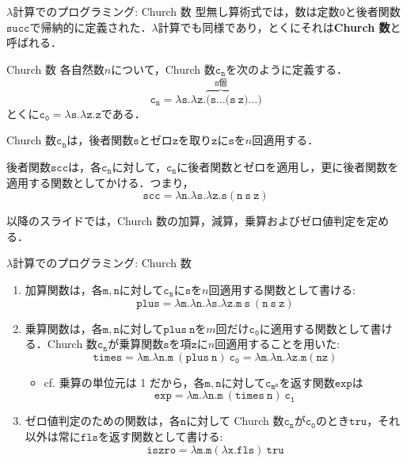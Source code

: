 \documentclass[9pt]{beamer}
\begin{document}
\begin{frame}{$\lambda$計算でのプログラミング: Church 数}
	型無し算術式では，数は定数$\mathtt{0}$と後者関数$\mathtt{succ}$で帰納的に定義された．$\mathtt{\lambda}$計算でも同様であり，とくにそれは\textbf{Church 数}と呼ばれる．
	\begin{dblock}{Church 数}
		各自然数$n$について，Church 数$\mathtt{c_{n}}$を次のように定義する．\begin{equation*}
			\mathtt{c_{n} = \lambda s. \lambda z. \overbrace{\mathtt{(s\ldots (s}}^{\text{$n$個}}\ z)\ldots)}
		\end{equation*}
		とくに$\mathtt{c_{0} =\lambda s.\lambda z.z}$である．
	\end{dblock}
	
	Church 数$\mathtt{c_{n}}$は，後者関数$\mathtt{s}$とゼロ$\mathtt{z}$を取り$\mathtt{z}$に$\mathtt{s}$を$n$回適用する．

	後者関数$\mathtt{scc}$は，各$\mathtt{c_{n}}$に対して，$\mathtt{c_{n}}$に後者関数とゼロを適用し，更に後者関数を適用する関数としてかける．つまり，\begin{equation*}
		\mathtt{scc = \lambda n. \lambda s. \lambda z. s (n\ s\ z)}
	\end{equation*}

	以降のスライドでは，Church 数の加算，減算，乗算およびゼロ値判定を定める．
\end{frame}
\begin{frame}{$\lambda$計算でのプログラミング: Church 数}
	\begin{enumerate}
		\item 加算関数は，各$\mathtt{m, n}$に対して$\mathtt{c_{n}}$に$\mathtt{s}$を$n$回適用する関数として書ける:\begin{equation*}
		\mathtt{plus = \lambda m. \lambda n. \lambda s. \lambda z. m\ s\ (n\ s\ z)}
		\end{equation*}
		\item 乗算関数は，各$\mathtt{m, n}$に対して$\mathtt{plus\ n}$を$m$回だけ$\mathtt{c_{0}}$に適用する関数として書ける．Church 数$\mathtt{c_{n}}$が乗算関数$\mathtt{s}$を項$\mathtt{z}$に$n$回適用することを用いた:\begin{equation*}
			\mathtt{times = \lambda m. \lambda n.  m\ (plus\ n)\ c_{0} = \lambda m. \lambda n.\lambda z. m(nz)}
		\end{equation*}
		\begin{itemize}
			\item cf. 乗算の単位元は 1 だから，各$\mathtt{m, n}$に対して$\mathtt{c_{m^{n}}}$を返す関数$\mathtt{exp}$は\begin{equation*}
				\mathtt{exp = \lambda m. \lambda n. m\ (times\ n)\ c_{1}}
			\end{equation*}
		\end{itemize}
		\item ゼロ値判定のための関数は，各$\mathtt{n}$に対して Church 数$\mathtt{c_{n}}$が$\mathtt{c_{0}}$のとき$\mathtt{tru}$，それ以外は常に$\mathtt{fls}$を返す関数として書ける:
		\begin{equation*}
			\mathtt{iszro = \lambda m. m (\lambda x. fls)\ tru}
		\end{equation*}
	\end{enumerate}
\end{frame}
\end{document}
